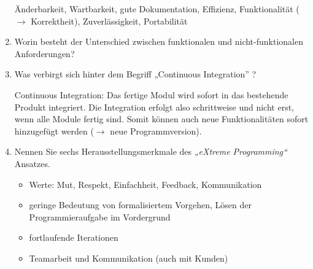\documentclass{bschlangaul-aufgabe}
\begin{document}
\begin{enumerate}
\begin{bAntwort}
Änderbarkeit, Wartbarkeit, gute Dokumentation, Effizienz, Funktionalität
($\rightarrow$ Korrektheit), Zuverlässigkeit, Portabilität
\end{bAntwort}

%

\item Worin besteht der Unterschied zwischen
funktionalen und nicht-funktionalen
Anforderungen?


%

\item Was verbirgt sich hinter dem Begriff „Continuous Integration”
?

\begin{bAntwort}
Continuous Integration: Das fertige Modul wird sofort in das bestehende
Produkt integriert. Die Integration erfolgt also schrittweise und nicht
erst, wenn alle Module fertig sind. Somit können auch neue
Funktionalitäten sofort hinzugefügt werden ($\rightarrow$ neue
Programmversion).
\end{bAntwort}

%

\item Nennen Sie sechs Herausstellungsmerkmale des \emph{„eXtreme
Programming“} Ansatzes.

\begin{bAntwort}
\begin{itemize}
\item Werte: Mut, Respekt, Einfachheit, Feedback, Kommunikation

\item geringe Bedeutung von formalisiertem Vorgehen, Lösen der
Programmieraufgabe im Vordergrund

\item fortlaufende Iterationen

\item Teamarbeit und Kommunikation (auch mit Kunden)


\end{itemize}
\end{bAntwort}
\end{enumerate}
\end{document}
